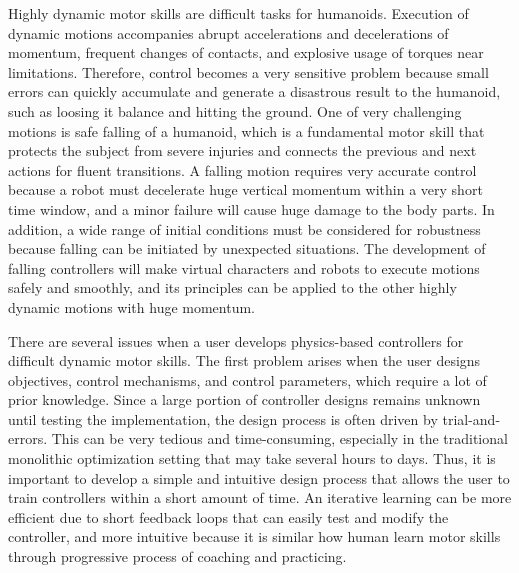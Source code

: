 Highly dynamic motor skills are difficult tasks for humanoids.
Execution of dynamic motions accompanies abrupt accelerations and decelerations
of momentum, frequent changes of contacts, and explosive usage of torques near
limitations.
Therefore, control becomes a very sensitive problem because small errors can
quickly accumulate and generate a disastrous result to the humanoid, such as
loosing it balance and hitting the ground.
One of very challenging motions is safe falling of a humanoid, which is 
a fundamental motor skill that protects the subject from severe
injuries and connects the previous and next actions for fluent transitions.
A falling motion requires very accurate control because a robot must decelerate
huge vertical momentum within a very short time window, and a minor failure
will cause huge damage to the body parts.
In addition, a wide range of initial conditions must be considered 
for robustness because falling can be initiated by unexpected situations.
The development of falling controllers will make virtual 
characters and robots to execute motions safely and smoothly,
and its principles can be applied to the other highly dynamic motions
with huge momentum.

There are several issues when a user develops physics-based controllers
for difficult dynamic motor skills.
The first problem arises when the user designs objectives, control 
mechanisms, and control parameters, which require a lot of prior knowledge.
Since a large portion of controller designs remains unknown until testing
the implementation, the design process is often driven by trial-and-errors.
This can be very tedious and time-consuming, especially in the traditional
monolithic optimization setting that may take several hours to days.
Thus, it is important to develop a simple and intuitive design process
that allows the user to train controllers within a short amount of time.
An iterative learning can be more efficient due to 
short feedback loops that can easily test and modify the controller,
and more intuitive because it is similar how human learn motor skills
through progressive process of coaching and practicing.

